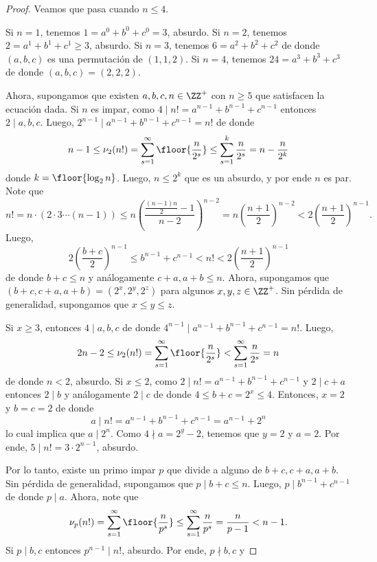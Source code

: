 \begin{proof}
  Veamos que pasa cuando $n\le 4$.
  \begin{itemize}
    \ii Si $n=1$, tenemos $1=a^0+b^0+c^0=3$, absurdo.
    \ii Si $n=2$, tenemos $2=a^1+b^1+c^1\ge 3$, absurdo.
    \ii Si $n=3$, tenemos $6=a^2+b^2+c^2$ de donde $(a,b,c)$ es una permutación
    de $(1,1,2)$.
    \ii Si $n=4$, tenemos $24=a^3+b^3+c^3$ de donde $(a,b,c)=(2,2,2)$.
  \end{itemize}
  Ahora, supongamos que existen $a,b,c,n\in\ZZ^+$ con $n\ge 5$ que satisfacen la
  ecuación dada. Si $n$ es impar, como $4\mid n!=a^{n-1}+b^{n-1}+c^{n-1}$
  entonces $2\mid a,b,c$. Luego, $2^{n-1}\mid a^{n-1}+b^{n-1}+c^{n-1}=n!$ de
  donde
  \[
    n-1
    \le\nu_2(n!)
    =\sum_{s=1}^\infty\floor{\frac{n}{2^s}}
    \le\sum_{s=1}^k\frac{n}{2^s}
    =n-\frac{n}{2^k}
  \]
  donde $k=\floor{\log_2n}$. Luego, $n\le 2^k$ que es un absurdo, y por ende $n$
  es par. Note que
  \[
    n!
    =n\cdot(2\cdot 3\cdots(n-1))
    \le n\left(\frac{\frac{(n-1)n}{2}-1}{n-2}\right)^{n-2}
    =n\left(\frac{n+1}{2}\right)^{n-2}
    <2\left(\frac{n+1}{2}\right)^{n-1}.
  \]
  Luego,
  \[
    2\left(\frac{b+c}{2}\right)^{n-1}
    \le b^{n-1}+c^{n-1}
    <n!
    <2\left(\frac{n+1}{2}\right)^{n-1}
  \]
  de donde $b+c\le n$ y análogamente $c+a,a+b\le n$. Ahora, supongamos que
  $(b+c,c+a,a+b)=(2^x,2^y,2^z)$ para algunos $x,y,z\in\ZZ^+$. Sin pérdida de
  generalidad, supongamos que $x\le y\le z$.
  \begin{itemize}
    \ii Si $x\ge 3$, entonces $4\mid a,b,c$ de donde
    $4^{n-1}\mid a^{n-1}+b^{n-1}+c^{n-1}=n!$. Luego,
    \[
      2n-2
      \le\nu_2(n!)
      =\sum_{s=1}^\infty\floor{\frac{n}{2^s}}
      <\sum_{s=1}^\infty\frac{n}{2^s}
      =n
    \]
    de donde $n<2$, absurdo.
    \ii Si $x\le 2$, como $2\mid n!=a^{n-1}+b^{n-1}+c^{n-1}$ y $2\mid c+a$
    entonces $2\mid b$ y análogamente $2\mid c$ de donde $4\le b+c=2^x\le 4$.
    Entonces, $x=2$ y $b=c=2$ de donde
    \[a\mid n!=a^{n-1}+b^{n-1}+c^{n-1}=a^{n-1}+2^n\]
    lo cual implica que $a\mid 2^n$. Como $4\nmid a=2^y-2$, tenemos que $y=2$ y
    $a=2$. Por ende, $5\mid n!=3\cdot 2^{n-1}$, absurdo.
  \end{itemize}
  Por lo tanto, existe un primo impar $p$ que divide a alguno de $b+c,c+a,a+b$.
  Sin pérdida de generalidad, supongamos que $p\mid b+c\le n$. Luego,
  $p\mid b^{n-1}+c^{n-1}$ de donde $p\mid a$. Ahora, note que
  \[
    \nu_p(n!)
    =\sum_{s=1}^\infty\floor{\frac{n}{p^s}}
    \le\sum_{s=1}^\infty\frac{n}{p^s}
    =\frac{n}{p-1}<n-1.
  \]
  Si $p\mid b,c$ entonces $p^{n-1}\mid n!$, absurdo. Por ende, $p\nmid b,c$ y

\end{proof}
